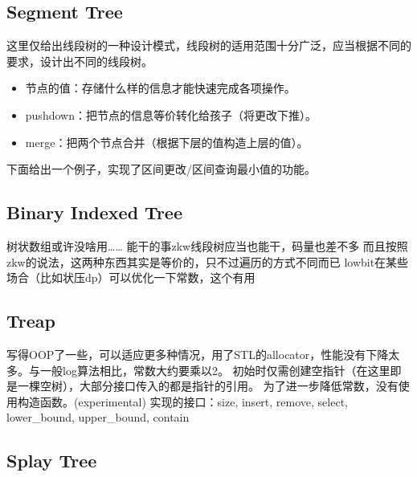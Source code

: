 \documentclass[twoside, UTF8]{article}
\begin{document}
		\subsection{Segment Tree}
			\begin{flushleft}
				这里仅给出线段树的一种设计模式，线段树的适用范围十分广泛，应当根据不同的要求，设计出不同的线段树。
				\begin{itemize}
					\item 节点的值：存储什么样的信息才能快速完成各项操作。
					\item pushdown：把节点的信息等价转化给孩子（将更改下推）。
					\item merge：把两个节点合并（根据下层的值构造上层的值）。
				\end{itemize}
				下面给出一个例子，实现了区间更改/区间查询最小值的功能。
			\end{flushleft}
			
		\subsection{Binary Indexed Tree}
			\begin{flushleft}
				树状数组或许没啥用……
				\linebreak 能干的事zkw线段树应当也能干，码量也差不多
				\linebreak 而且按照zkw的说法，这两种东西其实是等价的，只不过遍历的方式不同而已
				\linebreak lowbit在某些场合（比如状压dp）可以优化一下常数，这个有用
			\end{flushleft}
			
		\subsection{Treap}
			\begin{flushleft}
				写得OOP了一些，可以适应更多种情况，用了STL的allocator，性能没有下降太多。与一般log算法相比，常数大约要乘以2。
				\linebreak 初始时仅需创建空指针（在这里即是一棵空树），大部分接口传入的都是指针的引用。
				\linebreak 为了进一步降低常数，没有使用构造函数。(experimental)
				\linebreak 实现的接口：size, insert, remove, select, lower\_bound, upper\_bound, contain
			\end{flushleft}
			
		\subsection{Splay Tree}
			
	\newpage
\end{document}
